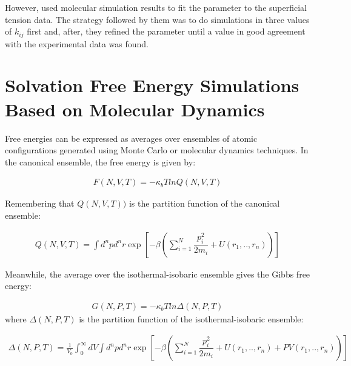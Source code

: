 However,  used molecular simulation results to fit the parameter to the superficial tension data. The strategy followed by them was to do simulations in three values of $k_{ij}$ first and, after, they refined the parameter until a value in good agreement with the experimental data was found. 

\section{Solvation Free Energy Simulations Based on Molecular Dynamics}

Free energies can be expressed as averages over ensembles of atomic configurations generated using Monte Carlo or molecular dynamics techniques. In the canonical ensemble, the free energy is given by:  

\begin{equation}
\label{eq:fcano}
\begin{aligned}
F(N,V,T) = -\kappa_{b}T ln Q(N,V,T)
\end{aligned}
\end{equation}

Remembering that $Q(N,V,T))$ is the partition function of the canonical ensemble:

\begin{equation}
\label{eq:partican}
\begin{aligned}
Q(N,V,T) = \int d^{n}p d^{n}r \exp \left[ -\beta \left( \sum_{i=1}^{N}\dfrac{p_{i}^{2}}{2m_{i}} + U(r_{1},..,r_{n}) \right)
\right]
\end{aligned}
\end{equation}

Meanwhile, the average over the isothermal-isobaric ensemble gives the Gibbs free energy:

\begin{equation}
\label{eq:fisobari}
\begin{aligned}
G(N,P,T) = -\kappa_{b}T ln \Delta (N,P,T)
\end{aligned}
\end{equation}
where $\Delta (N,P,T)$ is the partition function of the isothermal-isobaric ensemble:

\begin{equation}
\label{eq:partiso}
\begin{aligned}
\Delta (N,P,T) = \frac{1}{V_{0}} \int_{0}^{\infty} dV \int d^{n}p d^{n}r \exp \left[ -\beta \left( \sum_{i=1}^{N}\dfrac{p_{i}^{2}}{2m_{i}} + U(r_{1},..,r_{n}) + PV(r_{1},..,r_{n}) \right) \right]
\end{aligned}
\end{equation}


